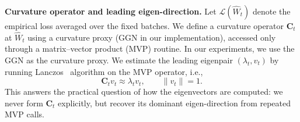 \documentclass{article}
\theoremstyle{plain}
\theoremstyle{definition}
\theoremstyle{remark}
\begin{document}
\noindent\textbf{Curvature operator and leading eigen-direction.}
Let $\mathcal L(\widehat W_t)$ denote the empirical loss averaged over the fixed batches.
We define a curvature operator $\mathbf C_t$ at $\widehat W_t$ using a curvature proxy (GGN in our implementation), accessed only through a matrix--vector product (MVP) routine. In our experiments, we use the GGN as the curvature proxy.
We estimate the leading eigenpair $(\lambda_t, v_t)$ by running Lanczos~\cite{ghorbaniInvestigationNeuralNet2019} algorithm on the MVP operator, i.e.,
$$
\mathbf C_t v_t \approx \lambda_t v_t,
\qquad \|v_t\|=1.
$$
This answers the practical question of how the eigenvectors are computed: we never form $\mathbf C_t$ explicitly, but recover its dominant eigen-direction from repeated MVP calls.



\end{document}
